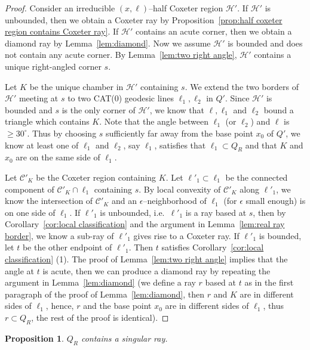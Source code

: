 \documentclass[11pt]{amsart}
\newcommand {\C}{\mathcal C}
\newcommand {\h}{\mathcal H}
\newtheorem{prop}[theorem]{Proposition}
\theoremstyle{definition}
\begin{document}
\begin{proof}
Consider an irreducible $(x,\ell)$--half Coxeter region $\h'$. If $\h'$ is unbounded, then we obtain a Coxeter ray by Proposition~\ref{prop:half coxeter region contains Coxeter ray}. If $\h'$ contains an acute corner, then we obtain a diamond ray by Lemma~\ref{lem:diamond}. Now we assume $\h'$ is bounded and does not contain any acute corner. By Lemma~\ref{lem:two right angle}, $\h'$ contains a unique right-angled corner $s$.
	
Let $K$ be the unique chamber in $\h'$ containing $s$. We extend the two borders of $\h'$ meeting at $s$ to two CAT(0) geodesic lines $\ell_1,\ell_2$ in $Q'$. Since $\h'$ is bounded and $s$ is the only corner of $\h'$, we know that $\ell,\ell_1$ and $\ell_2$ bound a triangle which contains $K$. Note that the angle between $\ell_1$ (or $\ell_2$) and $\ell$ is $\ge 30^{\circ}$. Thus by choosing $s$ sufficiently far away from the base point $x_0$ of $Q'$, we know at least one of $\ell_1$ and $\ell_2$, say $\ell_1$, satisfies that $\ell_1\subset Q_R$ and that $K$ and $x_0$ are on the same side of $\ell_1$.  

Let $\C'_K$ be the Coxeter region containing $K$. Let $\ell'_1\subset\ell_1$ be the connected component of $\C'_K\cap \ell_1$ containing $s$. By local convexity of $\C'_K$ along $\ell'_1$, we know the intersection of $\C'_K$ and an $\epsilon$--neighborhood of $\ell_1$ (for $\epsilon$ small enough) is on one side of $\ell_1$. If $\ell'_1$ is unbounded, i.e.\ $\ell'_1$ is a ray based at $s$, then by Corollary~\ref{cor:local classification} and the argument in Lemma~\ref{lem:real ray border}, we know a sub-ray of $\ell'_1$ gives rise to a Coxeter ray. If $\ell'_1$ is bounded, let $t$ be the other endpoint of $\ell'_1$. Then $t$ satisfies Corollary~\ref{cor:local classification} (1). The proof of Lemma~\ref{lem:two right angle} implies that the angle at $t$ is acute, then we can produce a diamond ray by repeating the argument in Lemma~\ref{lem:diamond} (we define a ray $r$ based at $t$ as in the first paragraph of the proof of Lemma~\ref{lem:diamond}, then $r$ and $K$ are in different sides of $\ell_1$, hence, $r$ and the base point $x_0$ are in different sides of $\ell_1$, thus $r\subset Q_R$, the rest of the proof is identical).
\end{proof}

\begin{prop}
	\label{prop:existence of singular rays}
$Q_R$ contains a singular ray.
\end{prop}
\end{document}
